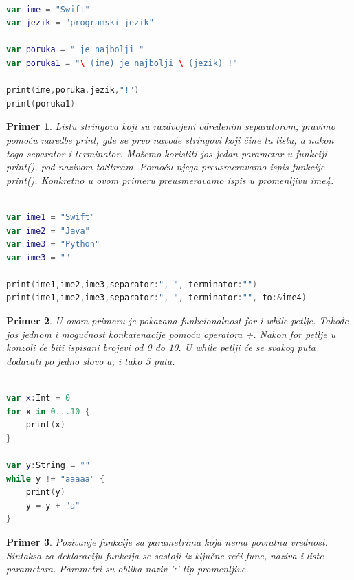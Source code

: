 \documentclass[a4paper]{article}
\newtheorem{primer}{Primer}[section]
\begin{document}
\begin{lstlisting}[language=Swift, caption={Stringovi i konkatenacija stringova},frame=single, label=simple]

var ime = "Swift"
var jezik = "programski jezik"

var poruka = " je najbolji "
var poruka1 = "\ (ime) je najbolji \ (jezik) !" 

print(ime,poruka,jezik,"!")
print(poruka1)

\end{lstlisting}

\begin{primer}
Listu stringova koji su razdvojeni određenim separatorom, pravimo pomoću naredbe print, gde se prvo navode stringovi koji čine tu listu, a nakon toga separator i terminator. Možemo koristiti jos jedan parametar u funkciji print(), pod nazivom toStream. Pomoću njega preusmeravamo ispis funkcije print(). Konkretno u ovom primeru preusmeravamo ispis u promenljivu ime4.
\end{primer}
\begin{lstlisting}[language=Swift, caption={Lista stringova},frame=single, label=simple]

var ime1 = "Swift"
var ime2 = "Java"
var ime3 = "Python"
var ime3 = ""

print(ime1,ime2,ime3,separator:", ", terminator:"")
print(ime1,ime2,ime3,separator:", ", terminator:"", to:&ime4)

\end{lstlisting}

\begin{primer}
U ovom primeru je pokazana funkcionalnost for i while petlje. Takođe jos jednom i mogućnost konkatenacije pomoću operatora +. Nakon for petlje u konzoli će biti ispisani brojevi od 0 do 10. U while petlji će se svakog puta dodavati po jedno slovo a, i tako 5 puta.
\end{primer}

\begin{lstlisting}[language=Swift, caption={Petlje},frame=single, label=simple]

var x:Int = 0
for x in 0...10 {
	print(x)
}

var y:String = ""
while y != "aaaaa" {
	print(y)
	y = y + "a"
}

\end{lstlisting}

\begin{primer}
Pozivanje funkcije sa parametrima koja nema povratnu vrednost. Sintaksa za deklaraciju funkcija se sastoji iz ključne reči func, naziva i liste parametara. Parametri su oblika naziv ':' tip promenljive.
\end{primer}
\end{document}
